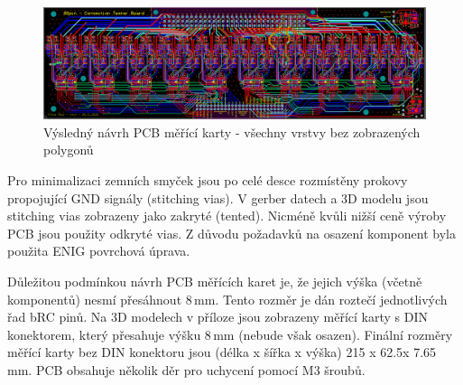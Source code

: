 \begin{figure}[ht!]
    \centering
    \includegraphics[width = 1\textwidth]{obrazky/all_layers_no_poly.png}
    \caption{Výsledný návrh PCB měřící karty - všechny vrstvy bez zobrazených polygonů}
    \label{fig:Všechny vrstvy bez polygonů}
\end{figure}
    
Pro minimalizaci zemních smyček jsou po celé desce rozmístěny prokovy propojující GND signály (stitching vias).
V gerber datech a 3D modelu jsou stitching vias zobrazeny jako zakryté (tented). Nicméně kvůli nižší ceně výroby PCB
jsou použity odkryté vias.
Z důvodu požadavků na osazení komponent byla použita ENIG povrchová úprava.\par

Důležitou podmínkou návrh PCB měřících karet je, že jejich výška (včetně komponentů) nesmí přesáhnout 8\,mm.
Tento rozměr je dán roztečí jednotlivých řad bRC pinů. Na 3D modelech v příloze jsou zobrazeny měřící karty
s DIN konektorem, který přesahuje výšku 8\,mm (nebude však osazen). Finální rozměry měřící karty bez DIN konektoru jsou
(délka x šířka x výška) 215 x 62.5x 7.65\,mm. PCB obsahuje několik děr pro uchycení pomocí M3 šroubů.
